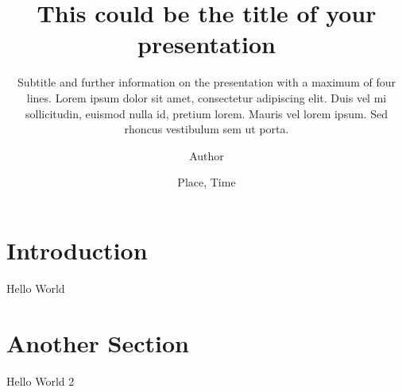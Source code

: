 \documentclass[
	aspectratio=169
	] {beamer}
\title[Shorttitle]{This could be the title of your presentation\-}
\subtitle{Subtitle and further information on the presentation with a maximum of four lines. Lorem ipsum dolor sit amet, consectetur adipiscing elit. Duis vel mi sollicitudin, euismod nulla id, pretium lorem. Mauris vel lorem ipsum. Sed rhoncus vestibulum sem ut porta. }
\author{Author}
\date{Place, Time}
\begin{document}
	\begin{frame}[plain]
		\titlepage
	\end{frame}

\maketocframe

\section{Introduction}
\begin{frame}{Hello World}
	\blindtext
\end{frame}

\section{Another Section}
\begin{frame}{Hello World 2}
	\blindtext
\end{frame}

\renewcommand{\thankyou}{Thank you very much for your attention!}
\renewcommand{\subthankyou}{I look forward to an exciting discussion!}
\renewcommand{\authormail}{author@upb.de}
\thankyouframe
\end{document}
